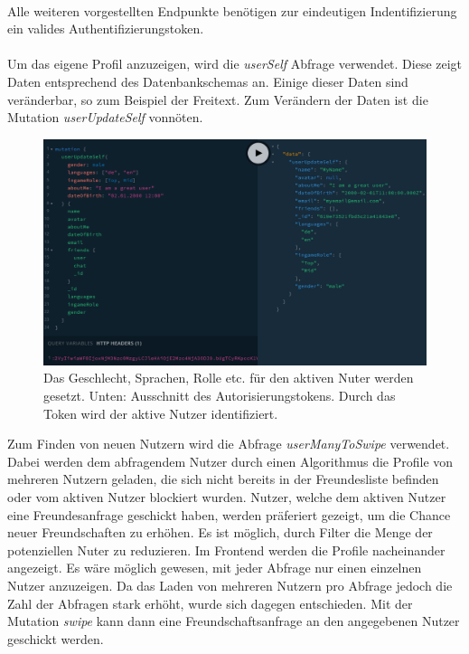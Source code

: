\paragraph{}
Alle weiteren vorgestellten Endpunkte benötigen zur eindeutigen Indentifizierung ein valides Authentifizierungstoken.

\paragraph{}
Um das eigene Profil anzuzeigen, wird die \textit{userSelf} Abfrage verwendet.
Diese zeigt Daten entsprechend des Datenbankschemas an.
Einige dieser Daten sind veränderbar, so zum Beispiel der Freitext.
Zum Verändern der Daten ist die Mutation \textit{userUpdateSelf} vonnöten.

\begin{figure}
	\centering
    \includegraphics[width=\textwidth]{sources/graphiql_userUpdateSelf.png}
	\caption{Das Geschlecht, Sprachen, Rolle etc. für den aktiven Nuter werden gesetzt. Unten: Ausschnitt des Autorisierungstokens. Durch das Token wird der aktive Nutzer identifiziert.}
	\label{fig:gql:4}
\end{figure}

Zum Finden von neuen Nutzern wird die Abfrage \textit{userManyToSwipe} verwendet. Dabei werden dem abfragendem Nutzer durch einen Algorithmus die Profile von mehreren Nutzern geladen, die sich nicht bereits in der Freundesliste befinden oder vom aktiven Nutzer blockiert wurden.
Nutzer, welche dem aktiven Nutzer eine Freundesanfrage geschickt haben, werden präferiert gezeigt, um die Chance neuer Freundschaften zu erhöhen.
Es ist möglich, durch Filter die Menge der potenziellen Nuter zu reduzieren.
Im Frontend werden die Profile nacheinander angezeigt.
Es wäre möglich gewesen,  mit jeder Abfrage nur einen einzelnen Nutzer anzuzeigen.
Da das Laden von mehreren Nutzern pro Abfrage jedoch die Zahl der Abfragen stark erhöht, wurde sich dagegen entschieden.
Mit der Mutation \textit{swipe} kann dann eine Freundschaftsanfrage an den angegebenen Nutzer geschickt werden.

